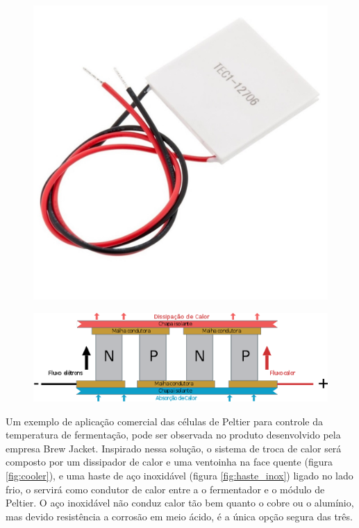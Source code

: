 \begin{figure}[H]
    \centering
    \includegraphics[scale=0.20]{figuras/projeto/hardware/pastilha_peltier.jpeg}
    \label{fig:peltier}
\end{figure}

\begin{figure}[H]
    \centering
    \includegraphics[scale=0.60]{figuras/projeto/hardware/peltier.png}
    \label{fig:esquema_peltier}
\end{figure}


Um exemplo de aplicação comercial das células de Peltier para controle da temperatura de fermentação, pode ser observada no produto desenvolvido pela empresa Brew Jacket. Inspirado nessa solução, o sistema de troca de calor será composto por um dissipador de calor e uma ventoinha na face quente (figura \ref{fig:cooler}), e uma haste de aço inoxidável (figura \ref{fig:haste_inox}) ligado no lado frio, o servirá como condutor de calor entre a o fermentador e o módulo de Peltier. O aço inoxidável não conduz calor tão bem quanto o cobre ou o alumínio, mas devido resistência a corrosão em meio ácido, é a única opção segura das três.


